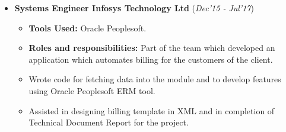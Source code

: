 \documentclass[10pt]{article}
\begin{document}
\hspace{-0.25cm}
\colorbox{bl}{}




\begin{itemize}[leftmargin=0.4cm]
	\item \textbf{Systems Engineer \textpipe  \hspace{0.05cm} Infosys Technology Ltd} \hfill{(\textit{Dec'15 - Jul'17})}
	
	\begin{itemize}
	    \item  \textbf{Tools Used:} Oracle Peoplesoft.
		\item \textbf{Roles and responsibilities:} Part of the team which developed an application which automates billing for the customers of the client.
		\item Wrote code for fetching data into the module and to develop features using Oracle Peoplesoft ERM tool.
		\item Assisted in designing billing template in XML and in completion of Technical Document Report for the project.
	
	\end{itemize}
\end{itemize}


\colorbox{bl}{}
\end{document}
